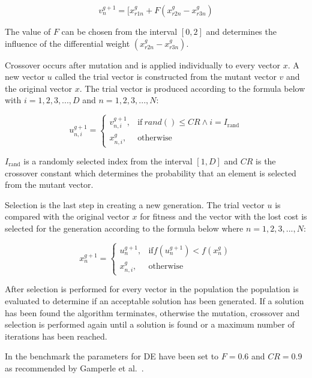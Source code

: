 \begin{equation}
v_{n}^{g+1} = [ x_{r1n}^{g} + F(x_{r2n}^{g} - x_{r3n}^{g})
\end{equation}

The value of $F$ can be chosen from the interval $[0,2]$ and determines the influence of the differential weight $(x_{r2n}^{g} - x_{r3n}^{g})$.

Crossover occurs after mutation and is applied individually to every vector $x$. A new vector $u$ called the trial vector is constructed from the mutant vector $v$ and the original vector $x$. The trial vector is produced according to the formula below with $i=1,2,3,...,D$ and $n=1,2,3,...,N$:

\begin{equation}
    u_{n,i}^{g+1} =
    \begin{cases}
      v_{n,i}^{g+1}, & \text{if}\ rand() \leq CR \wedge i = I_{\text{rand}} \\
      x_{n,i}^{g}, & \text{otherwise}
\end{cases}
\end{equation}

$I_{\text{rand}}$ is a randomly selected index from the interval $[1,D]$ and $CR$ is the crossover constant which determines the probability that an element is selected from the mutant vector.

Selection is the last step in creating a new generation. The trial vector $u$ is compared with the original vector $x$ for fitness and the vector with the lost cost is selected for the generation according to the formula below where $n=1,2,3,...,N$:

\begin{equation}
    x_{n}^{g+1} =
    \begin{cases}
      u_{n}^{g+1}, & \text{if} f(u_{n}^{g+1}) < f(x_{n}^{g}) \\
      x_{n,i}^{g}, & \text{otherwise}
\end{cases}
\end{equation}

After selection is performed for every vector in the population the population is evaluated to determine if an acceptable solution has been generated. If a solution has been found the algorithm terminates, otherwise the mutation, crossover and selection is performed again until a solution is found or a maximum number of iterations has been reached.

In the benchmark the parameters for DE have been set to $F = 0.6$ and $CR=0.9$ as recommended by Gamperle et al.~\cite{gamperle2002parameter}.

